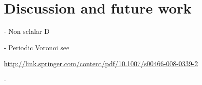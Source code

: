 \documentclass[discussion.tex]{subfiles}
\begin{document}
\chapter{Discussion and future work}

- Non sclalar D

- Periodic Voronoi see

 \url{http://link.springer.com/content/pdf/10.1007/s00466-008-0339-2}
 
 - 
\end{document}
